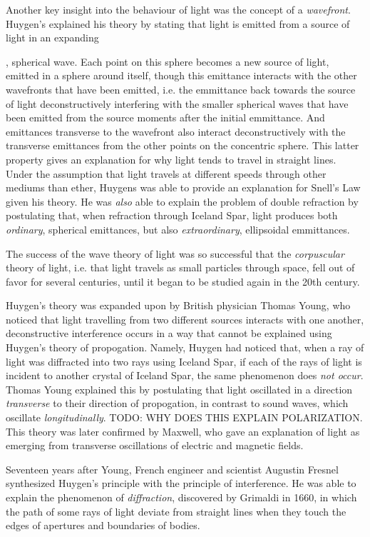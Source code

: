 Another key insight into the behaviour of light was the concept of a \emph{wavefront}. Huygen's explained his theory by stating that light is emitted from a source of light in an expanding

, spherical wave. Each point on this sphere becomes a new source of light, emitted in a sphere around itself, though this emittance interacts with the other wavefronts that have been emitted, i.e. the emmittance back towards the source of light deconstructively interfering with the smaller spherical waves that have been emitted from the source moments after the initial emmittance. And emittances transverse to the wavefront also interact deconstructively with the transverse emittances from the other points on the concentric sphere. This latter property gives an explanation for why light tends to travel in straight lines. Under the assumption that light travels at different speeds through other mediums than ether, Huygens was able to provide an explanation for Snell's Law given his theory. He was \emph{also} able to explain the problem of double refraction by postulating that, when refraction through Iceland Spar, light produces both \emph{ordinary}, spherical emittances, but also \emph{extraordinary}, ellipsoidal emmittances.

The success of the wave theory of light was so successful that the \emph{corpuscular} theory of light, i.e. that light travels as small particles through space, fell out of favor for several centuries, until it began to be studied again in the 20th century.

Huygen's theory was expanded upon by British physician Thomas Young, who noticed that light travelling from two different sources interacts with one another, deconstructive interference occurs in a way that cannot be explained using Huygen's theory of propogation. Namely, Huygen had noticed that, when a ray of light was diffracted into two rays using Iceland Spar, if each of the rays of light is incident to another crystal of Iceland Spar, the same phenomenon does \emph{not occur}. Thomas Young explained this by postulating that light oscillated in a direction \emph{transverse} to their direction of propogation, in contrast to sound waves, which oscillate \emph{longitudinally}. TODO: WHY DOES THIS EXPLAIN POLARIZATION. This theory was later confirmed by Maxwell, who gave an explanation of light as emerging from transverse oscillations of electric and magnetic fields.


Seventeen years after Young, French engineer and scientist Augustin Fresnel synthesized Huygen's principle with the principle of interference. He was able to explain the phenomenon of \emph{diffraction}, discovered by Grimaldi in 1660, in which the path of some rays of light deviate from straight lines when they touch the edges of apertures and boundaries of bodies.



